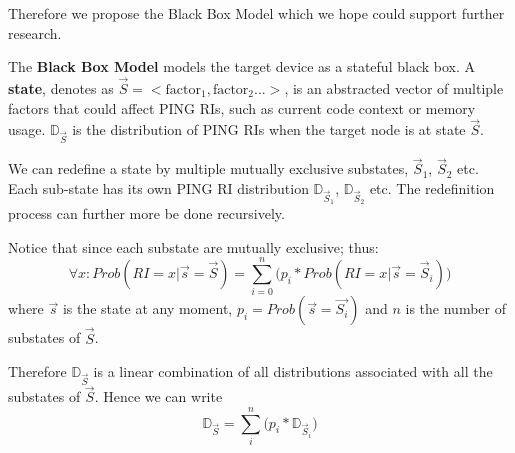 Therefore we propose the Black Box Model which we hope could support further research.

\begin{definition}
The \textbf{Black Box Model} models the target device as a stateful black box. A \textbf{state}, denotes as $\vec{S}=<\text{factor}_1, \text{factor}_2...>$, is an abstracted vector of multiple factors that could affect PING RIs, such as current code context or memory usage. $\mathbb{D}_{\vec{S}}$ is the distribution of PING RIs when the target node is at state $\vec{S}$.
\end{definition}

We can redefine a state by multiple mutually exclusive substates, $\vec{S}_1$, $\vec{S}_2$ etc. Each sub-state has its own PING RI distribution $\mathbb{D}_{\vec{S}_1}$, $\mathbb{D}_{\vec{S}_2}$ etc. The redefinition process can further more be done recursively.

Notice that since each substate are mutually exclusive; thus:
\begin{equation*}
\forall x: Prob(RI = x | \vec{s}=\vec{S}) = \sum_{i=0}^{n}{\big( p_i*Prob(RI = x | \vec{s} = \vec{S}_i)\big)}
\end{equation*}
where $\vec{s}$ is the state at any moment, $p_i = Prob(\vec{s} = \vec{S_i})$ and $n$ is the number of substates of $\vec{S}$.

Therefore $\mathbb{D}_{\vec{S}}$ is a linear combination of all distributions associated with all the substates of $\vec{S}$. Hence we can write
\begin{equation} \label{Eq: pD}
\mathbb{D}_{\vec{S}} = \sum_{i}^{n}{\big(p_i * \mathbb{D}_{\vec{S}_i} \big)}
\end{equation}

